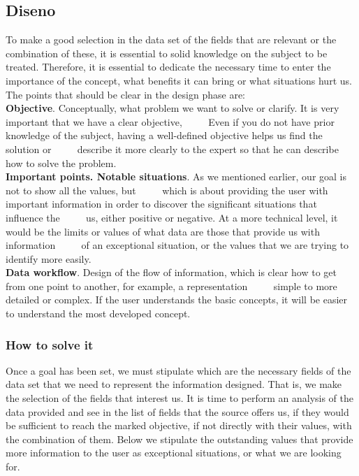 \subsection{Diseno}
To make a good selection in the data set of the fields that are relevant or the combination of these, it is essential to
solid knowledge on the subject to be treated. Therefore, it is essential to dedicate the necessary time to enter the
importance of the concept, what benefits it can bring or what situations hurt us.
The points that should be clear in the design phase are: \\

\textbf{Objective}. Conceptually, what problem we want to solve or clarify. It is very important that we have a clear objective,
     Even if you do not have prior knowledge of the subject, having a well-defined objective helps us find the solution or
     describe it more clearly to the expert so that he can describe how to solve the problem. \\

\textbf{Important points. Notable situations}. As we mentioned earlier, our goal is not to show all the values, but
     which is about providing the user with important information in order to discover the significant situations that influence the
     us, either positive or negative. At a more technical level, it would be the limits or values of what data are those that provide us with information
     of an exceptional situation, or the values that we are trying to identify more easily. \\

\textbf{Data workflow}. Design of the flow of information, which is clear how to get from one point to another, for example, a representation
     simple to more detailed or complex. If the user understands the basic concepts, it will be easier to understand the most developed concept.

\subsubsection{How to solve it} 
Once a goal has been set, we must stipulate which are the necessary fields of the data set that we need to represent the information
designed. That is, we make the selection of the fields that interest us. It is time to perform an analysis of the data provided and see in
the list of fields that the source offers us, if they would be sufficient to reach the marked objective, if not directly with their values, with the combination of them.
Below we stipulate the outstanding values that provide more information to the user as exceptional situations, or what we are looking for.



